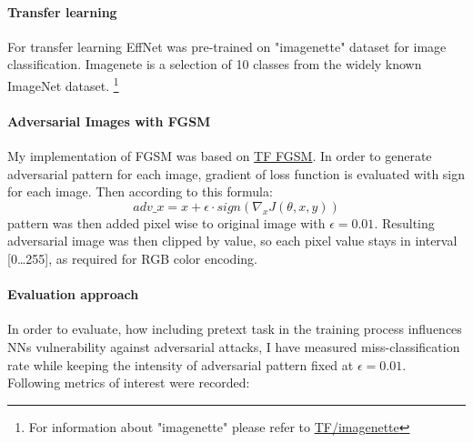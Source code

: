 \paragraph{Transfer learning}
For transfer learning EffNet was pre-trained on "imagenette" dataset for image classification.
Imagenete is a selection of 10 classes from the widely known ImageNet dataset. \footnote{
    For information about "imagenette" please refer to \href{https://www.tensorflow.org/datasets/catalog/imagenette}{TF/imagenette}
}

\paragraph{Adversarial Images with FGSM}
My implementation of FGSM was based on \href{https://www.tensorflow.org/tutorials/generative/adversarial_fgsm}{TF FGSM}.
In order to generate adversarial pattern for each image,
gradient of loss function is evaluated with sign for each image.
Then according to this formula:
\begin{equation}
    adv\_x = x + \epsilon \cdot sign(\nabla_x J(\theta, x, y))
\end{equation}
pattern was then added pixel wise to original image with $\epsilon = 0.01$.
Resulting adversarial image was then clipped by value, so each pixel value stays in interval [0\ldots255],
as required for RGB color encoding.

\paragraph{Evaluation approach}
In order to evaluate, how including pretext task in the training process influences NNs vulnerability against adversarial attacks,
I have measured miss-classification rate while keeping the intensity of adversarial pattern fixed at $\epsilon = 0.01$.
\\
Following metrics of interest were recorded:

